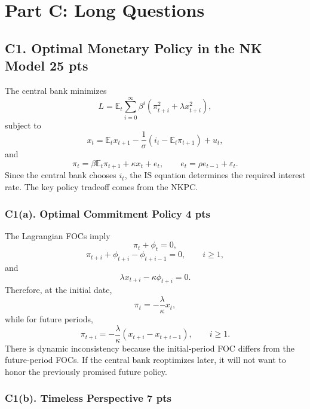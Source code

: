 \documentclass[11pt]{article}
\begin{document}
\section*{Part C: Long Questions}

\subsection*{C1. Optimal Monetary Policy in the NK Model \hfill 25 pts}

The central bank minimizes
\[
L=\mathbb{E}_t\sum_{i=0}^{\infty}\beta^i
\left(\pi_{t+i}^2+\lambda x_{t+i}^2\right),
\]
subject to
\[
x_t=\mathbb{E}_tx_{t+1}-\frac{1}{\sigma}(i_t-\mathbb{E}_t\pi_{t+1})+u_t,
\]
and
\[
\pi_t=\beta \mathbb{E}_t\pi_{t+1}+\kappa x_t+e_t,
\qquad
 e_t=\rho e_{t-1}+\varepsilon_t.
\]
Since the central bank chooses \(i_t\), the IS equation determines the required interest rate. The key policy tradeoff comes from the NKPC.

\subsubsection*{C1(a). Optimal Commitment Policy \hfill 4 pts}

The Lagrangian FOCs imply
\[
\pi_t+\phi_t=0,
\]
\[
\pi_{t+i}+\phi_{t+i}-\phi_{t+i-1}=0,
\qquad i\geq 1,
\]
and
\[
\lambda x_{t+i}-\kappa\phi_{t+i}=0.
\]
Therefore, at the initial date,
\[
\pi_t=-\frac{\lambda}{\kappa}x_t,
\]
while for future periods,
\[
\pi_{t+i}
=
-\frac{\lambda}{\kappa}(x_{t+i}-x_{t+i-1}),
\qquad i\geq 1.
\]
There is dynamic inconsistency because the initial-period FOC differs from the future-period FOCs. If the central bank reoptimizes later, it will not want to honor the previously promised future policy.

\subsubsection*{C1(b). Timeless Perspective \hfill 7 pts}
\end{document}
